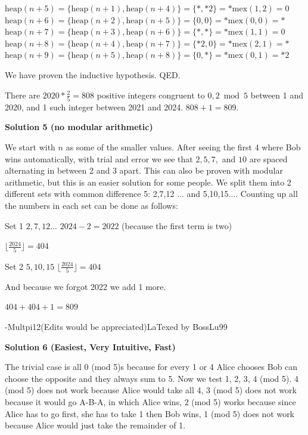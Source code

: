 \begin{enumerate}
 
$\text{heap}(n+5) = \{\text{heap}(n+1), \text{heap}(n+4)\} = \{*, *2\} = *\text{mex}(1, 2) = 0$
$\text{heap}(n+6) = \{\text{heap}(n+2), \text{heap}(n+5)\} = \{0, 0\} = *\text{mex}(0, 0) = *$
$\text{heap}(n+7) = \{\text{heap}(n+3), \text{heap}(n+6)\} = \{*, *\} = *\text{mex}(1, 1) = 0$
$\text{heap}(n+8) = \{\text{heap}(n+4), \text{heap}(n+7)\} = \{*2, 0\} = *\text{mex}(2, 1) = *$
$\text{heap}(n+9) = \{\text{heap}(n+5), \text{heap}(n+8)\} = \{0, *\} = *\text{mex}(0, 1) = *2$

 
We have proven the inductive hypothesis. QED.

 There are $2020*\frac{2}{5}=808$ positive integers congruent to $0,2 \bmod{5}$ between 1 and 2020, and 1 such integer between 2021 and 2024. $808 + 1 = \boxed{809}$.

 



\textbf{Solution 5 (no modular arithmetic)}

We start with $n$ as some of the smaller values. After seeing the first 4 where Bob wins automatically, with trial and error we see that $2, 5, 7,$ and $10$ are spaced alternating in between 2 and 3 apart. This can also be proven with modular arithmetic, but  this is an easier solution for some people. We split them into 2 different sets with common difference 5: {2,7,12 ...} and {5,10,15...}. Counting up all the numbers in each set can be done as follows:

 Set 1 ${2,7,12...}$
$2024-2=2022$ (because the first term is two)

 $\lfloor \frac{2024}{5} \rfloor = 404$

 Set 2 ${5,10,15}$
$\lfloor \frac{2024}{5} \rfloor = 404$

 
And because we forgot 2022 we add 1 more.

 $404+404+1=809$

 -Multpi12(Edits would be appreciated)LaTexed by BossLu99

 


 



\textbf{Solution 6 (Easiest, Very Intuitive, Fast)}

The trivial case is all 0 (mod 5)s because for every 1 or 4 Alice chooses Bob can choose the opposite and they always sum to 5. Now we test 1, 2, 3, 4 (mod 5). 4 (mod 5) does not work because Alice would take all 4, 3 (mod 5) does not work because it would go A-B-A, in which Alice wins, 2 (mod 5) works because since Alice has to go first, she has to take 1 then Bob wins, 1 (mod 5) does not work because Alice would just take the remainder of 1. 


\end{enumerate}
